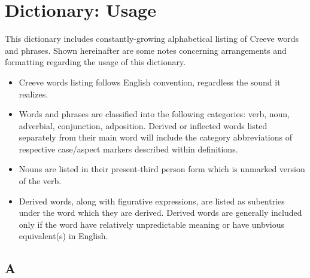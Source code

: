 \section*{Dictionary: Usage}
This dictionary includes constantly-growing alphabetical listing of Creeve words and phrases. Shown hereinafter are some notes concerning arrangements and formatting regarding the usage of this dictionary.

\begin{itemize}
\item Creeve words listing follows English convention, regardless the sound it realizes.
\item Words and phrases are classified into the following categories: verb, noun, adverbial, conjunction, adposition. Derived or inflected words listed separately from their main word will include the category abbreviations of respective case/aspect markers described within definitions.
\item Nouns are listed in their present-third person form which is unmarked version of the verb.
\item Derived words, along with figurative expressions, are listed as subentries under the word which they are derived. Derived words are generally included only if the word have relatively unpredictable meaning or have unbvious equivalent(s) in English.
\end{itemize}

\newpage
\pagestyle{dict}
\begin{center}
    \section*{A}
\end{center}

\begin{multicols}{2}

    

\end{multicols}

